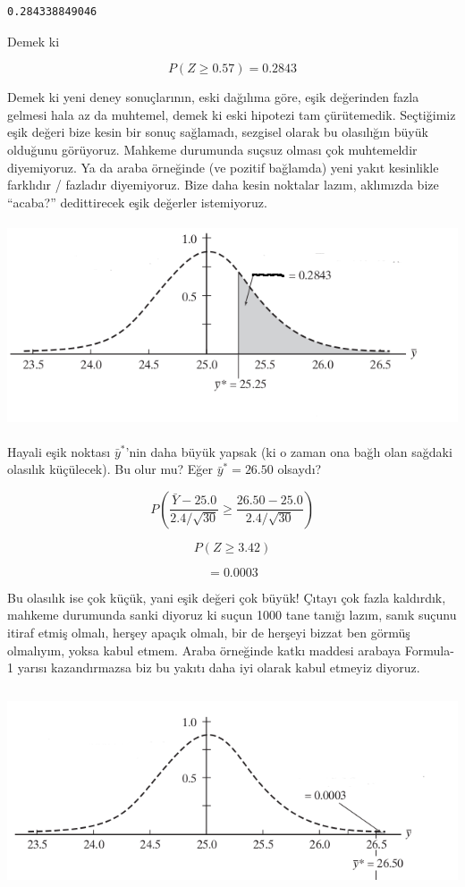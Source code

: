 \documentclass[12pt,fleqn]{article}\usepackage{../../common}
\begin{document}
\begin{verbatim}
0.284338849046
\end{verbatim}

Demek ki

$$ P(Z \ge 0.57) = 0.2843$$

Demek ki yeni deney sonuçlarının, eski dağılıma göre, eşik değerinden fazla
gelmesi hala az da muhtemel, demek ki eski hipotezi tam
çürütemedik. Seçtiğimiz eşik değeri bize kesin bir sonuç sağlamadı,
sezgisel olarak bu olasılığın büyük olduğunu görüyoruz. Mahkeme durumunda
suçsuz olması çok muhtemeldir diyemiyoruz. Ya da araba örneğinde (ve
pozitif bağlamda) yeni yakıt kesinlikle farklıdır / fazladır
diyemiyoruz. Bize daha kesin noktalar lazım, aklımızda bize ``acaba?''
dedittirecek eşik değerler istemiyoruz.

\includegraphics[height=6cm]{carhyp1.png}

Hayali eşik noktası $\bar{y}^*$'nin daha büyük yapsak (ki o zaman ona bağlı
olan sağdaki olasılık küçülecek). Bu olur mu? Eğer $\bar{y}^* = 26.50$
olsaydı? 

$$ P(\frac{\bar{Y} - 25.0}{2.4 / \sqrt{30}} \ge 
\frac{26.50 - 25.0}{2.4 / \sqrt{30}}) 
$$

$$ P(Z \ge 3.42) $$

$$ = 0.0003 $$

Bu olasılık ise çok küçük, yani eşik değeri çok büyük! Çıtayı çok fazla
kaldırdık, mahkeme durumunda sanki diyoruz ki suçun 1000 tane tanığı lazım,
sanık suçunu itiraf etmiş olmalı, herşey apaçık olmalı, bir de herşeyi
bizzat ben görmüş olmalıyım, yoksa kabul etmem. Araba örneğinde katkı
maddesi arabaya Formula-1 yarısı kazandırmazsa biz bu yakıtı daha iyi
olarak kabul etmeyiz diyoruz.

\includegraphics[height=6cm]{carhyp2.png}
\end{document}
